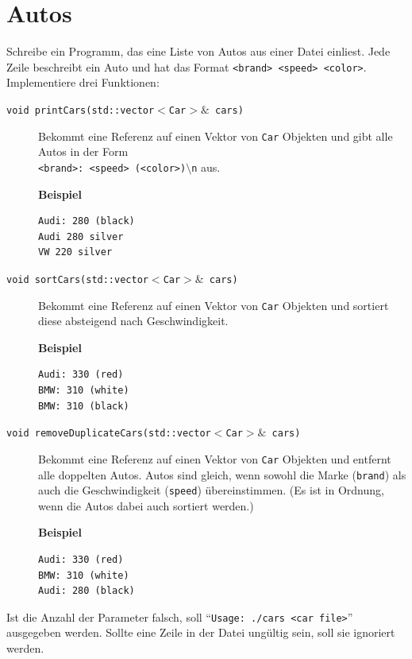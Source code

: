 \documentclass[a4paper,10pt]{article}
\begin{document}
\section*{Autos}

Schreibe ein Programm, das eine Liste von Autos aus einer Datei einliest. Jede Zeile beschreibt ein Auto und hat das Format \texttt{<brand> <speed> <color>}. Implementiere drei Funktionen:
\begin{description}
 \item[\texttt{void printCars(std::vector$<$Car$>\&$ cars)}] Bekommt eine Referenz auf einen Vektor von \texttt{Car} Objekten und gibt alle Autos in der Form \\
 \texttt{<brand>: <speed> (<color>)$\setminus$n} aus. 
 
   \textbf{Beispiel}  {\footnotesize\begin{verbatim}Audi: 280 (black)
Audi 280 silver
VW 220 silver\end{verbatim}}
 
 
 \item[\texttt{void sortCars(std::vector$<$Car$>\&$ cars)}] Bekommt eine Referenz auf einen Vektor von \texttt{Car} Objekten und sortiert diese absteigend nach Geschwindigkeit.
 
 \textbf{Beispiel} {\footnotesize\begin{verbatim}Audi: 330 (red)
BMW: 310 (white) 
BMW: 310 (black)\end{verbatim}}
 
 \item[\texttt{void removeDuplicateCars(std::vector$<$Car$>\&$ cars)}] Bekommt eine Referenz auf einen Vektor von \texttt{Car} Objekten und entfernt alle doppelten Autos. Autos sind gleich, wenn sowohl die Marke (\texttt{brand}) als auch die Geschwindigkeit (\texttt{speed}) übereinstimmen. (Es ist in Ordnung, wenn die Autos dabei auch sortiert werden.)
 
 \textbf{Beispiel} {\footnotesize\begin{verbatim}Audi: 330 (red)
BMW: 310 (white)
Audi: 280 (black)\end{verbatim}}
 
\end{description}

Ist die Anzahl der Parameter falsch, soll ``\texttt{Usage: ./cars <car file>}'' ausgegeben werden. Sollte eine Zeile in der Datei ungültig sein, soll sie ignoriert werden.

\vspace{1em}
\end{document}
